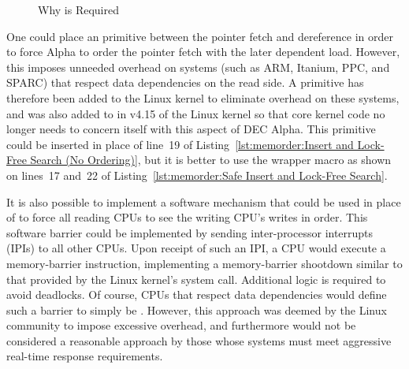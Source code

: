 \begin{figure}[tbp]
\centering
{}
\caption{Why  is Required}
\label{fig:memorder:Why smp-read-barrier-depends() is Required}
\end{figure}

One could place an  primitive
between the pointer fetch and dereference in order to force Alpha
to order the pointer fetch with the later dependent load.
However, this imposes unneeded overhead on systems (such as ARM,
Itanium, PPC, and SPARC) that respect data dependencies on the read side.
A  primitive has therefore been added to the
Linux kernel to eliminate overhead on these systems, and was also added
to  in v4.15 of the Linux kernel so that core kernel
code no longer needs to concern itself with this aspect of DEC Alpha.
This  primitive could be inserted in
place of line~19 of
Listing~\ref{lst:memorder:Insert and Lock-Free Search (No Ordering)},
but it is better to use the  wrapper macro
as shown on lines~17 and~22 of
Listing~\ref{lst:memorder:Safe Insert and Lock-Free Search}.

It is also possible to implement a software mechanism
that could be used in place of  to force
all reading CPUs to see the writing CPU's writes in order.
This software barrier could be implemented by sending inter-processor
interrupts (IPIs) to all other CPUs.
Upon receipt of such an IPI, a CPU would execute a memory-barrier
instruction, implementing a memory-barrier shootdown similar to that
provided by the Linux kernel's  system call.
Additional logic is required to avoid deadlocks.
Of course, CPUs that respect data dependencies would define such a barrier
to simply be .
However, this approach was deemed by the Linux community
to impose excessive overhead, and furthermore would
not be considered a reasonable approach by those whose systems must meet
aggressive real-time response requirements.

